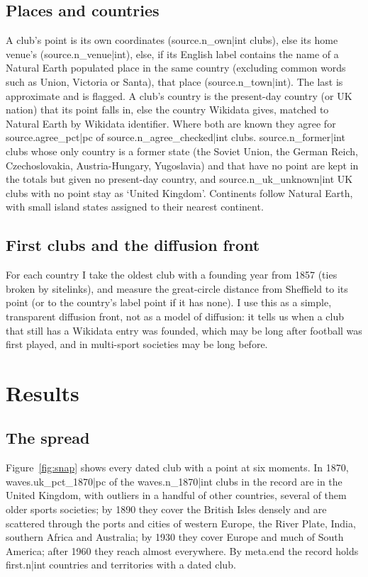 \documentclass[11pt,a4paper]{article}
\begin{document}
\subsection{Places and countries}
A club's point is its own coordinates ({{source.n_own|int}} clubs), else its home venue's ({{source.n_venue|int}}), else, if its English label contains the name of a Natural Earth populated place in the same country (excluding common words such as Union, Victoria or Santa), that place ({{source.n_town|int}}). The last is approximate and is flagged. A club's country is the present-day country (or UK nation) that its point falls in, else the country Wikidata gives, matched to Natural Earth by Wikidata identifier. Where both are known they agree for {{source.agree_pct|pc}} of {{source.n_agree_checked|int}} clubs. {{source.n_former|int}} clubs whose only country is a former state (the Soviet Union, the German Reich, Czechoslovakia, Austria-Hungary, Yugoslavia) and that have no point are kept in the totals but given no present-day country, and {{source.n_uk_unknown|int}} UK clubs with no point stay as `United Kingdom'. Continents follow Natural Earth, with small island states assigned to their nearest continent.

\subsection{First clubs and the diffusion front}
For each country I take the oldest club with a founding year from 1857 (ties broken by sitelinks), and measure the great-circle distance from Sheffield to its point (or to the country's label point if it has none). I use this as a simple, transparent diffusion front, not as a model of diffusion: it tells us when a club that still has a Wikidata entry was founded, which may be long after football was first played, and in multi-sport societies may be long before.

\section{Results}
\subsection{The spread}
Figure~\ref{fig:snap} shows every dated club with a point at six moments. In 1870, {{waves.uk_pct_1870|pc}} of the {{waves.n_1870|int}} clubs in the record are in the United Kingdom, with outliers in a handful of other countries, several of them older sports societies; by 1890 they cover the British Isles densely and are scattered through the ports and cities of western Europe, the River Plate, India, southern Africa and Australia; by 1930 they cover Europe and much of South America; after 1960 they reach almost everywhere. By {{meta.end}} the record holds {{first.n|int}} countries and territories with a dated club.
\end{document}
